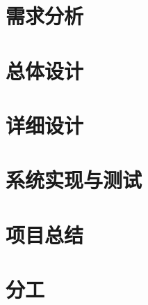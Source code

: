 \documentclass[12pt,hyperref,a4paper,UTF8]{ctexart}
\begin{document}
\cover

\begin{abstract}

在此填写摘要内容

\end{abstract}

\thispagestyle{empty} %

\newpage
\tableofcontents

\newpage
\section{需求分析}

\section{总体设计}

\section{详细设计}

\section{系统实现与测试}

\section{项目总结}

\section{分工}





\end{document}
